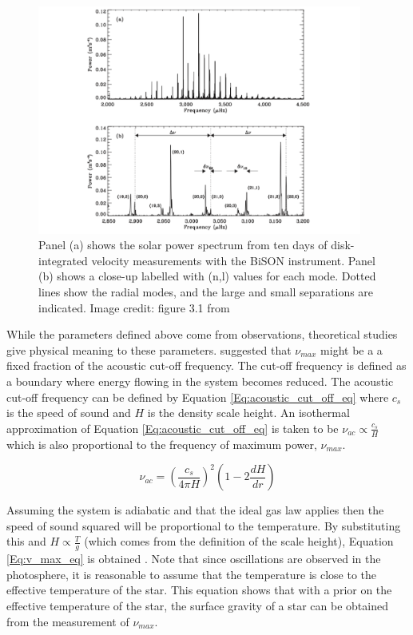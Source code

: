\begin{figure}
    \centering
    \includegraphics[width=0.95\textwidth]{Figures/1-Introduction/power_spectrum_sun.pdf}
    \caption[Example of solar power spectrum from which asteroseismic analysis can be conducted]{Panel (a) shows the solar power spectrum from ten days of disk-integrated velocity measurements with the BiSON instrument. Panel (b) shows a close-up labelled with (n,l) values for each mode. Dotted lines show the radial modes, and the large and small separations are indicated. Image credit: figure 3.1 from \citet{Palle_Esteban_2014}}
    \label{fig:power_spectrum_example_sun}
\end{figure}

While the parameters defined above come from observations, theoretical studies give physical meaning to these parameters. \citet{Brown_etal_1991} suggested that $\nu_{max}$ might be a a fixed fraction of the acoustic cut-off frequency. The cut-off frequency is defined as a boundary where energy flowing in the system becomes reduced. The acoustic cut-off frequency can be defined by Equation \ref{Eq:acoustic_cut_off_eq} where $c_{s}$ is the speed of sound and $H$ is the density scale height. An isothermal approximation of Equation \ref{Eq:acoustic_cut_off_eq} is taken to be $\nu_{ac} \propto \frac{c_{s}}{H}$ which is also proportional to the frequency of maximum power, $\nu_{max}$.

\begin{equation}
    \nu_{ac} = \left(\frac{c_{s}}{4\pi H}\right)^{2}\left(1 - 2\frac{dH}{dr}\right)
    \label{Eq:acoustic_cut_off_eq}
\end{equation}

Assuming the system is adiabatic and that the ideal gas law applies then the speed of sound squared will be proportional to the temperature. By substituting this and $H \propto \frac{T}{g}$ (which comes from the definition of the scale height), Equation \ref{Eq:v_max_eq} is obtained \citep{Kjeldsen_Bedding_1995}. Note that since oscillations are observed in the photosphere, it is reasonable to assume that the temperature is close to the effective temperature of the star. This equation shows that with a prior on the effective temperature of the star, the surface gravity of a star can be obtained from the measurement of $\nu_{max}$.

